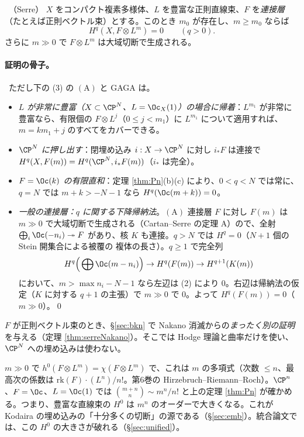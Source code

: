 \begin{thm}\label{thm:serreV}\tC\ （Serre）
$X$ をコンパクト複素多様体、$L$ を豊富な正則直線束、$F$ を\emph{連接層}（たとえば正則ベクトル束）とする。このとき $m_0$ が存在し、$m\ge m_0$ ならば
\[
H^q(X,F\otimes L^m)=0\qquad(q>0).
\]
さらに $m\gg0$ で $F\otimes L^m$ は大域切断で生成される。
\end{thm}
\paragraph{証明の骨子。}\tP\ ただし下の (3) の $\mathrm{(A)}$ と GAGA は\tC。
\begin{itemize}
\item[(0)] \emph{$L$ が非常に豊富（$X\subset\CP^N$、$L=\Oc_X(1)$）の場合に帰着}：$L^{m_1}$ が非常に豊富なら、有限個の $F\otimes L^j$（$0\le j<m_1$）に $L^{m_1}$ について適用すれば、$m=km_1+j$ のすべてをカバーできる。
\item[(1)] \emph{$\CP^N$ に押し出す}：閉埋め込み $i:X\to\CP^N$ に対し $i_*F$ は連接で $H^q(X,F(m))=H^q(\CP^N,i_*F(m))$（$i_*$ は完全）。
\item[(2)] \emph{$F=\Oc(k)$ の有限直和}：定理 \ref{thm:Pn}(b)(c) により、$0<q<N$ では常に、$q=N$ では $m+k>-N-1$ なら $H^q(\Oc(m+k))=0$。
\item[(3)] \emph{一般の連接層：$q$ に関する下降帰納法}。$\mathrm{(A)}$ 連接層 $F$ に対し $F(m)$ は $m\gg0$ で大域切断で生成される（Cartan--Serre の定理 A\tC）ので、全射 $\bigoplus_i\Oc(-n_i)\twoheadrightarrow F$ があり、核 $K$ も連接。$q>N$ では $H^q=0$（$N+1$ 個の Stein 開集合による被覆の \Cech{} 複体の長さ）。$q\ge1$ で完全列
\[
H^q\Big(\bigoplus\Oc(m-n_i)\Big)\to H^q(F(m))\to H^{q+1}(K(m))
\]
において、$m>\max n_i-N-1$ なら左辺は (2) により $0$。右辺は帰納法の仮定（$K$ に対する $q+1$ の主張）で $m\gg0$ で $0$。よって $H^q(F(m))=0$（$m\gg0$）。\qed
\end{itemize}
$F$ が正則ベクトル束のとき、\S\ref{sec:bkn} で Nakano 消滅からの\emph{まったく別の証明}を与える（定理 \ref{thm:serreNakano}）。そこでは Hodge 理論と曲率だけを使い、$\CP^N$ への埋め込みは使わない。

\begin{rem}
$m\gg0$ で $h^0(F\otimes L^m)=\chi(F\otimes L^m)$ で、これは $m$ の多項式（次数 $\le n$、最高次の係数は $\mathrm{rk}(F)\cdot(L^n)/n!$。第6巻の Hirzebruch--Riemann--Roch）。$\CP^n$、$F=\Oc$、$L=\Oc(1)$ では $\binom{m+n}n\sim m^n/n!$ と上の定理 \ref{thm:Pn} が確かめる。つまり、豊富な直線束の $H^0$ は $m^n$ のオーダーで大きくなる。これが Kodaira の埋め込みの「十分多くの切断」の源である（\S\ref{sec:emb}）。統合論文では、この $H^0$ の大きさが破れる（\S\ref{sec:unified}）。
\end{rem}

